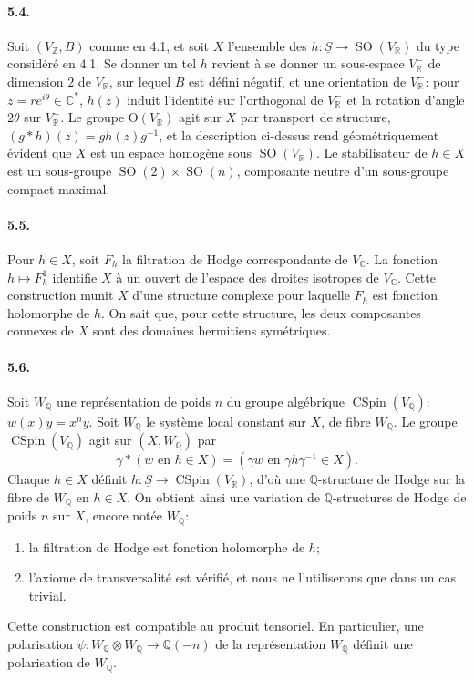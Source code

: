 \documentclass[10pt]{article}
\newcommand{\C}{\mathbb{C}}
\newcommand{\Q}{\mathbb{Q}}
\newcommand{\R}{\mathbb{R}}
\newcommand{\Z}{\mathbb{Z}}
\newcommand{\SO}{\operatorname{SO}}
\newcommand{\CSpin}{\operatorname{CSpin}}
\begin{document}
\paragraph{5.4.} Soit $(V_\Z,B)$ comme en 4.1, et soit $X$ l'ensemble des $h:\underline S\to\SO(V_\R)$ du type considéré en 4.1. Se donner un tel $h$ revient à se donner un sous-espace $V^-_\R$ de dimension $2$ de $V_\R$, sur lequel $B$ est défini négatif, et une orientation de $V^-_\R$: pour $z=r e^{i\theta}\in\C^*$, $h(z)$ induit l'identité sur l'orthogonal de $V^-_\R$ et la rotation d'angle $2\theta$ sur $V^-_\R$. Le groupe $\mathrm O(V_\R)$ agit sur $X$ par transport de structure, $(g*h)(z)=g h(z)g^{-1}$, et la description ci-dessus rend géométriquement évident que $X$ est un espace homogène sous $\SO(V_\R)$. Le stabilisateur de $h\in X$ est un sous-groupe $\SO(2)\times\SO(n)$, composante neutre d'un sous-groupe compact maximal.

\paragraph{5.5.} Pour $h\in X$, soit $F_h$ la filtration de Hodge correspondante de $V_\C$. La fonction $h\mapsto F_h^1$ identifie $X$ à un ouvert de l'espace des droites isotropes de $V_\C$. Cette construction munit $X$ d'une structure complexe pour laquelle $F_h$ est fonction holomorphe de $h$. On sait que, pour cette structure, les deux composantes connexes de $X$ sont des domaines hermitiens symétriques.

\paragraph{5.6.} Soit $W_\Q$ une représentation de poids $n$ du groupe algébrique $\CSpin(V_\Q)$: $w(x)y=x^n y$. Soit $W_\Q$ le système local constant sur $X$, de fibre $W_\Q$. Le groupe $\CSpin(V_\Q)$ agit sur $(X,W_\Q)$ par
\[
\gamma*(w\text{ en }h\in X)=(\gamma w\text{ en }\gamma h\gamma^{-1}\in X).
\]
Chaque $h\in X$ définit $h:\underline S\to\CSpin(V_\R)$, d'où une $\Q$-structure de Hodge sur la fibre de $W_\Q$ en $h\in X$. On obtient ainsi une variation de $\Q$-structures de Hodge de poids $n$ sur $X$, encore notée $W_\Q$:
\begin{enumerate}[label=\alph*)]
\item la filtration de Hodge est fonction holomorphe de $h$;
\item l'axiome de transversalité est vérifié, et nous ne l'utiliserons que dans un cas trivial.
\end{enumerate}
Cette construction est compatible au produit tensoriel. En particulier, une polarisation $\psi:W_\Q\otimes W_\Q\to\Q(-n)$ de la représentation $W_\Q$ définit une polarisation de $W_\Q$.
\end{document}
